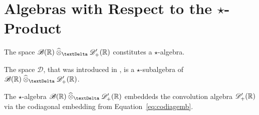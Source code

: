 \section{Algebras with Respect to the $\star$-Product}
\label{alg}


\begin{conjecture}
    The space $ \fsSmobnd( \nrR ) \cteproDi \fsDiscau( \nrR ) $
    constitutes a $ \star $-algebra.
\end{conjecture}

\begin{remark}
    The space $ \mathcal{D} $,
    that was introduced in \cite{RBG025,ryc025},
    is a $ \star $-subalgebra of $ \fsSmobnd( \nrR ) \cteproDi \fsDiscau( \nrR ) $.
\end{remark}

\begin{remark}
    The $\star$-algebra $ \fsSmobnd( \nrR ) \cteproDi \fsDiscau( \nrR ) $
    embeddeds the convolution algebra $ \mathscr{  D  }'_+( \mathbb{ R } ) $
    via the codiagonal embedding from Equation~\eqref{eq:codiagemb}.
\end{remark}